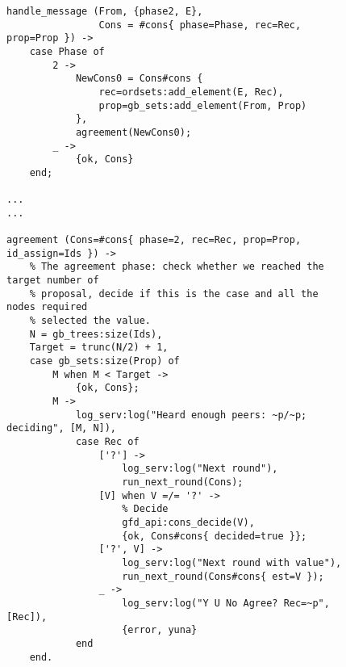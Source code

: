\begin{figure}[tb!]
\begin{lstlisting}[caption={Agreement Phase},
                   label={code:ConsAgreement}]
handle_message (From, {phase2, E},
                Cons = #cons{ phase=Phase, rec=Rec, prop=Prop }) ->
    case Phase of
        2 ->
            NewCons0 = Cons#cons {
                rec=ordsets:add_element(E, Rec),
                prop=gb_sets:add_element(From, Prop)
            },
            agreement(NewCons0);
        _ ->
            {ok, Cons}
    end;

...
...

agreement (Cons=#cons{ phase=2, rec=Rec, prop=Prop, id_assign=Ids }) ->
    % The agreement phase: check whether we reached the target number of
    % proposal, decide if this is the case and all the nodes required
    % selected the value.
    N = gb_trees:size(Ids),
    Target = trunc(N/2) + 1,
    case gb_sets:size(Prop) of
        M when M < Target ->
            {ok, Cons};
        M ->
            log_serv:log("Heard enough peers: ~p/~p; deciding", [M, N]),
            case Rec of
                ['?'] ->
                    log_serv:log("Next round"),
                    run_next_round(Cons);
                [V] when V =/= '?' ->
                    % Decide
                    gfd_api:cons_decide(V),
                    {ok, Cons#cons{ decided=true }};
                ['?', V] ->
                    log_serv:log("Next round with value"),
                    run_next_round(Cons#cons{ est=V });
                _ ->
                    log_serv:log("Y U No Agree? Rec=~p", [Rec]),
                    {error, yuna}
            end
    end.
\end{lstlisting}
\end{figure}

